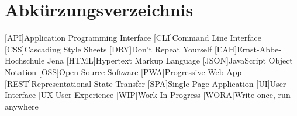 \section*{Abkürzungsverzeichnis}
\begin{acronym}[xxxxxxx]\itemsep0pt
    [API]{Application Programming Interface}
    [CLI]{Command Line Interface}
    [CSS]{Cascading Style Sheets}
    [DRY]{Don’t Repeat Yourself}
    [EAH]{Ernst-Abbe-Hochschule Jena}
    [HTML]{Hypertext Markup Language}
    [JSON]{JavaScript Object Notation}
    [OSS]{Open Source Software}
    [PWA]{Progressive Web App}
    [REST]{Representational State Transfer}
    [SPA]{Single-Page Application}
    [UI]{User Interface}
    [UX]{User Experience}
    [WIP]{Work In Progress}
    [WORA]{Write once, run anywhere}
\end{acronym}
